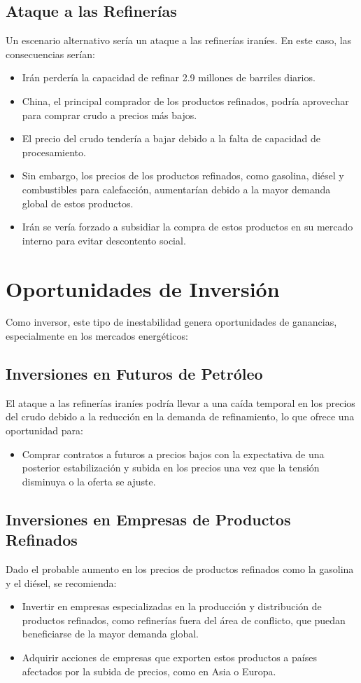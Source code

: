 \documentclass{article}
\begin{document}
\subsection{Ataque a las Refinerías}
Un escenario alternativo sería un ataque a las refinerías iraníes. En este caso, las consecuencias serían:
\begin{itemize}
    \item Irán perdería la capacidad de refinar 2.9 millones de barriles diarios.
    \item China, el principal comprador de los productos refinados, podría aprovechar para comprar crudo a precios más bajos.
    \item El precio del crudo tendería a bajar debido a la falta de capacidad de procesamiento.
    \item Sin embargo, los precios de los productos refinados, como gasolina, diésel y combustibles para calefacción, aumentarían debido a la mayor demanda global de estos productos.
    \item Irán se vería forzado a subsidiar la compra de estos productos en su mercado interno para evitar descontento social.
\end{itemize}

\section{Oportunidades de Inversión}
Como inversor, este tipo de inestabilidad genera oportunidades de ganancias, especialmente en los mercados energéticos:

\subsection{Inversiones en Futuros de Petróleo}
El ataque a las refinerías iraníes podría llevar a una caída temporal en los precios del crudo debido a la reducción en la demanda de refinamiento, lo que ofrece una oportunidad para:
\begin{itemize}
    \item Comprar contratos a futuros a precios bajos con la expectativa de una posterior estabilización y subida en los precios una vez que la tensión disminuya o la oferta se ajuste.
\end{itemize}

\subsection{Inversiones en Empresas de Productos Refinados}
Dado el probable aumento en los precios de productos refinados como la gasolina y el diésel, se recomienda:
\begin{itemize}
    \item Invertir en empresas especializadas en la producción y distribución de productos refinados, como refinerías fuera del área de conflicto, que puedan beneficiarse de la mayor demanda global.
    \item Adquirir acciones de empresas que exporten estos productos a países afectados por la subida de precios, como en Asia o Europa.
\end{itemize}
\end{document}
